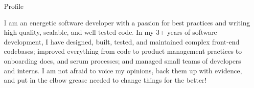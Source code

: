 \documentclass[]{mcdowellcv}
\begin{document}
	\makeheader

	\begin{cvsection}{Profile}
		\vspace{2pt}
		\begin{cvsubsection}{}{}{}
			I am an energetic software developer with a passion for best practices and writing high quality, scalable,  and well tested code.
			In my 3+ years of software development, I have designed, built, tested, and maintained complex front-end codebases;
			improved everything from code to product management practices to onboarding docs, and scrum processes;
			and managed small teams of developers and interns. I am not afraid to voice my opinions, back them up with evidence,
			and put in the elbow grease needed to change things for the better!
		\end{cvsubsection}
	\end{cvsection}
\end{document}
